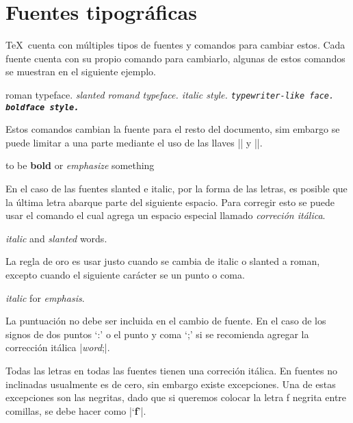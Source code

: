 \section{Fuentes tipográficas}

\TeX\ cuenta con múltiples tipos de fuentes y comandos para cambiar estos. 
Cada fuente cuenta con su propio comando para cambiarlo, algunas de estos comandos se muestran en el siguiente ejemplo.

\begin{texexample}
  \rm roman typeface.
  \sl slanted romand typeface.
  \it italic style.
  \tt typewriter-like face.
  \bf boldface style.
\end{texexample}

Estos comandos cambian la fuente para el resto del documento, sim embargo se puede limitar a una parte mediante el uso de las llaves \texline|{| y \texline|}|.

\begin{texexample}
  to be {\bf bold} or {\sl emphasize} something
\end{texexample}

En el caso de las fuentes slanted e italic, por la forma de las letras, es posible que la última letra abarque parte del siguiente espacio. Para corregir esto se puede usar el comando \texcs\/ el cual agrega un espacio especial llamado \emph{correción itálica}.

\begin{texexample}
  {\it italic\/} and {\sl slanted\/} words.
\end{texexample}

La regla de oro es usar \texcs\/ justo cuando se cambia de italic o slanted a roman, excepto cuando el siguiente carácter se un punto o coma.

\begin{texexample}
  {\it italic\/} for {\it emphasis}.
\end{texexample}

La puntuación no debe ser incluida en el cambio de fuente. En el caso de los signos de dos puntos `:' o el punto y coma `;' si se recomienda agregar la corrección itálica \texline|{\it word\/};|.

Todas las letras en todas las fuentes tienen una correción itálica. En fuentes no inclinadas usualmente es de cero, sin embargo existe excepciones. Una de estas excepciones son las negritas, dado que si queremos colocar la letra f negrita entre comillas, se debe hacer como \texline|`{\bf f\/}'|.

